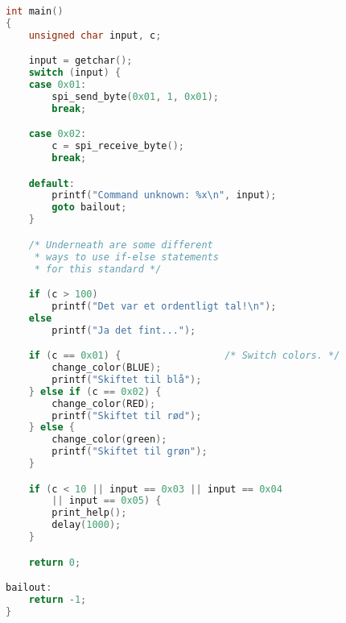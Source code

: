 \documentclass[article, 10pt]{memoir}
\begin{document}
\begin{landscape}
\begin{multicols}{2}
\begin{lstlisting}[language=c]
int main()
{
    unsigned char input, c;

    input = getchar();
    switch (input) {
    case 0x01:
        spi_send_byte(0x01, 1, 0x01);
        break;

    case 0x02:
        c = spi_receive_byte();
        break;

    default:
        printf("Command unknown: %x\n", input);
        goto bailout;
    }

    /* Underneath are some different 
     * ways to use if-else statements
     * for this standard */

    if (c > 100)
        printf("Det var et ordentligt tal!\n");
    else
        printf("Ja det fint...");

    if (c == 0x01) {                  /* Switch colors. */
        change_color(BLUE);
        printf("Skiftet til blå");
    } else if (c == 0x02) {
        change_color(RED);
        printf("Skiftet til rød");
    } else {
        change_color(green);
        printf("Skiftet til grøn");
    }

    if (c < 10 || input == 0x03 || input == 0x04
        || input == 0x05) {
        print_help();
        delay(1000);
    }

    return 0;

bailout:
    return -1;
}
\end{lstlisting}
\end{multicols}
\end{landscape}
\end{document}
